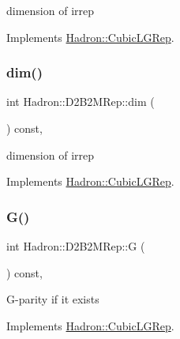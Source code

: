 dimension of irrep 

Implements \mbox{\hyperlink{structHadron_1_1CubicLGRep_a3acbaea26503ed64f20df693a48e4cdd}{Hadron\+::\+Cubic\+L\+G\+Rep}}.

\mbox{\label{structHadron_1_1D2B2MRep_a5beebf66fecabd7ee94b861df9f607c9}} 
\subsubsection{\texorpdfstring{dim()}{dim()}\hspace{0.1cm}{\footnotesize\ttfamily [3/3]}}
{\footnotesize\ttfamily int Hadron\+::\+D2\+B2\+M\+Rep\+::dim (\begin{DoxyParamCaption}{ }\end{DoxyParamCaption}) const\hspace{0.3cm}{\ttfamily [inline]}, {\ttfamily [virtual]}}

dimension of irrep 

Implements \mbox{\hyperlink{structHadron_1_1CubicLGRep_a3acbaea26503ed64f20df693a48e4cdd}{Hadron\+::\+Cubic\+L\+G\+Rep}}.

\mbox{\label{structHadron_1_1D2B2MRep_a084bfd1709cfe35d65be35b8950cb32c}} 
\subsubsection{\texorpdfstring{G()}{G()}\hspace{0.1cm}{\footnotesize\ttfamily [1/3]}}
{\footnotesize\ttfamily int Hadron\+::\+D2\+B2\+M\+Rep\+::G (\begin{DoxyParamCaption}{ }\end{DoxyParamCaption}) const\hspace{0.3cm}{\ttfamily [inline]}, {\ttfamily [virtual]}}

G-\/parity if it exists 

Implements \mbox{\hyperlink{structHadron_1_1CubicLGRep_ace26f7b2d55e3a668a14cb9026da5231}{Hadron\+::\+Cubic\+L\+G\+Rep}}.

\mbox{\label{structHadron_1_1D2B2MRep_a084bfd1709cfe35d65be35b8950cb32c}} 

